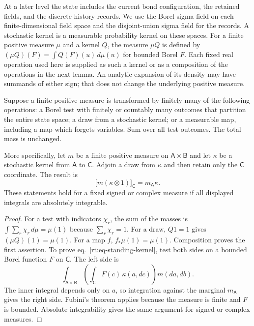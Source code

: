 \documentclass[11pt,letterpaper,reqno]{amsart}
\makeatletter
\numberwithin{equation}{section}
\renewcommand{\eqref}[1]{\textup{eq.~\ref{#1}}}
\theoremstyle{definition}
\newcommand{\ms@minorstart}{%
  \pushQED{\qed}\renewcommand{\qedsymbol}{$\blacksquare$}}
\newenvironment{lemma}[1][]{\ms@minorstart\ms@lemma[#1]}
  {\popQED\endms@lemma}
\theoremstyle{remark}
\makeatother
\begin{document}
At a later level the state includes the current bond configuration,
the retained fields, and the discrete history records. We use the
Borel sigma field on each finite-dimensional field space and the
disjoint-union sigma field for the records. A stochastic kernel
is a measurable probability kernel on these spaces. For a finite
positive measure $\mu$ and a kernel $Q$, the measure $\mu Q$ is
defined by $(\mu Q)(F)=\int Q(F)(u)\,d\mu(u)$ for bounded Borel
$F$. Each fixed real operation used here is supplied as such a
kernel or as a composition of the operations in the next lemma.
An analytic expansion of its density may have summands of either
sign; that does not change the underlying positive measure.

\begin{lemma}[Mass and retained variables]\label{rt:lem-mass}
Suppose a finite positive measure is transformed by finitely many
of the following operations: a Borel test with finitely or countably many outcomes that
partition the entire state space; a draw from a stochastic kernel; or a
measurable map, including a map which forgets variables. Sum over
all test outcomes. The total mass is unchanged.

More specifically, let $m$ be a finite positive measure on
$\mathsf A\times\mathsf B$ and let $\kappa$ be a stochastic
kernel from $\mathsf A$ to $\mathsf C$. Adjoin a draw from
$\kappa$ and then retain only the $\mathsf C$ coordinate. The
result is
\begin{equation}\label{rt:eq-standing-kernel}
       \bigl[m(\kappa\otimes1)\bigr]_{\mathsf C}
                          =m_{\mathsf A}\kappa.
\end{equation}
These statements hold for a fixed signed or complex measure if
all displayed integrals are absolutely integrable.
\end{lemma}
\begin{proof}
For a test with indicators $\chi_r$, the sum of the masses is
$\int\sum_r\chi_r\,d\mu=\mu(1)$ because $\sum_r\chi_r=1$.
For a draw, $Q1=1$ gives $(\mu Q)(1)=\mu(1)$. For a map $f$,
$f_*\mu(1)=\mu(1)$. Composition proves the first assertion.
To prove \eqref{rt:eq-standing-kernel}, test both sides on a
bounded Borel function $F$ on $\mathsf C$. The left side is
\[
 \int_{\mathsf A\times\mathsf B}
       \left(\int_{\mathsf C}F(c)\,\kappa(a,dc)\right)m(da,db).
\]
The inner integral depends only on $a$, so integration against the
marginal $m_{\mathsf A}$ gives the right side. Fubini's theorem
applies because the measure is finite and $F$ is bounded. Absolute
integrability gives the same argument for signed or complex measures.
\end{proof}
\end{document}
